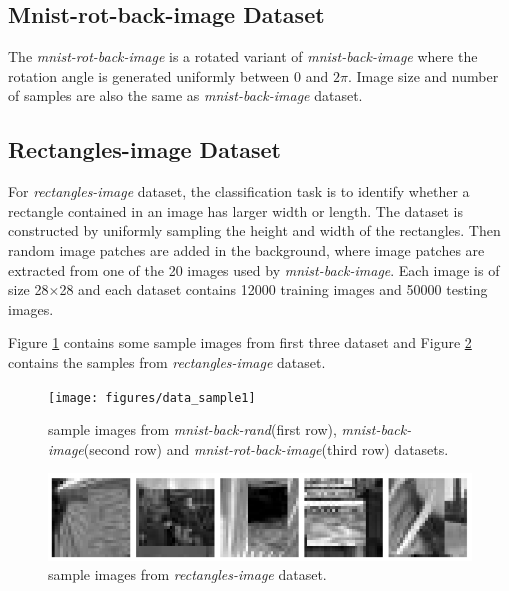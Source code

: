 \subsection{Mnist-rot-back-image Dataset}
The \textit{mnist-rot-back-image} is a rotated variant of \textit{mnist-back-image} where the rotation angle is generated uniformly between $0$ and $2\pi$. Image size and number of samples are also the same as \textit{mnist-back-image} dataset.
\subsection{Rectangles-image Dataset}
For \textit{rectangles-image} dataset, the classification task is to identify whether a rectangle contained in an image has larger width or length. The dataset is constructed by uniformly sampling the height and width of the rectangles. Then random image patches are added in the background, where image patches are extracted from one of the 20 images used by \textit{mnist-back-image}. Each image is of size 28$\times$28 and each dataset contains 12000 training images and 50000 testing images.

Figure \ref{samples} contains some sample images from first three dataset and Figure \ref{chap2_rect} contains the samples from \textit{rectangles-image} dataset.
\begin{figure}[h]
  \centering
  \captionsetup{justification=centering,margin=0.1cm}
  \texttt{[image: figures/data\_sample1]}
  \caption{sample images from \textit{mnist-back-rand}(first row), \textit{mnist-back-image}(second row) and \textit{mnist-rot-back-image}(third row) datasets.}
  \label{samples}
\end{figure}

\begin{figure}[h]
  \centering
  \captionsetup{justification=centering,margin=0.1cm}
  \includegraphics[scale=0.55]{figures/rect_image}
  \caption{sample images from \textit{rectangles-image} dataset.}
  \label{chap2_rect}
\end{figure}

